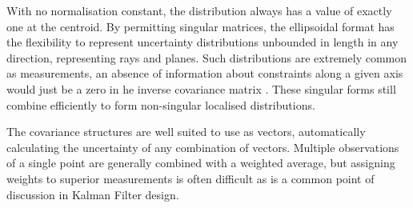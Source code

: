 \documentclass{article}
\newcounter{subsubsubsection}[subsubsection]
\begin{document}
        With no normalisation constant, the distribution always has a value of exactly one at the centroid.
        By permitting singular matrices, the ellipsoidal format has the flexibility to represent uncertainty distributions unbounded in length in any direction, representing rays and planes.  Such distributions are extremely common as measurements, an absence of information about constraints along a given axis would just be a zero in he inverse covariance matrix \cite{UncertainGeo}.  These singular forms still combine efficiently to form non-singular localised distributions.
        
        The covariance structures are well suited to use as vectors, automatically calculating the uncertainty of any combination of vectors. 
        Multiple observations of a single point are generally combined with a weighted average, but assigning weights to superior measurements is often difficult as is a common point of discussion in Kalman Filter design.
        
\end{document}
